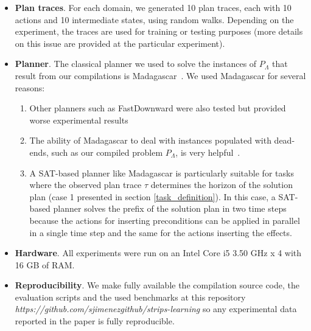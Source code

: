 \begin{itemize}
\item {\bf Plan traces}. For each domain, we generated 10 plan traces, each with 10 actions and 10 intermediate states, using random walks. Depending on the experiment, the traces are used for training or testing purposes (more details on this issue are provided at the particular experiment).

\item {\bf Planner}. The classical planner we used to solve the instances of $P_\Lambda$ that result from our compilations is {\sc Madagascar}~\cite{rintanen2014madagascar}. We used {\sc Madagascar} for several reasons:

  \begin{enumerate}
  \item Other planners such as {\sc FastDownward} were also tested but provided worse experimental results
  \item The ability of {\sc Madagascar} to deal with instances populated with dead-ends, such as our compiled problem $P_\Lambda$, is very helpful~\cite{lopez2015deterministic}.
  \item A SAT-based planner like {\sc Madagascar} is particularly suitable for tasks where the observed plan trace $\tau$ determines the horizon of the solution plan (case 1 presented in section \ref{task_definition}). In this case, a SAT-based planner solves the prefix of the solution plan in two time steps because the actions for inserting preconditions can be applied in parallel in a single time step and the same for the actions inserting the effects. 
  \end{enumerate}

\item {\bf Hardware}. All experiments were run on an Intel Core i5 3.50 GHz x 4 with 16 GB of RAM.

\item {\bf Reproducibility}. We make fully available the compilation source code, the evaluation scripts and the used benchmarks at this repository {\em https://github.com/sjimenezgithub/strips-learning} so any experimental data reported in the paper is fully reproducible.
\end{itemize}

